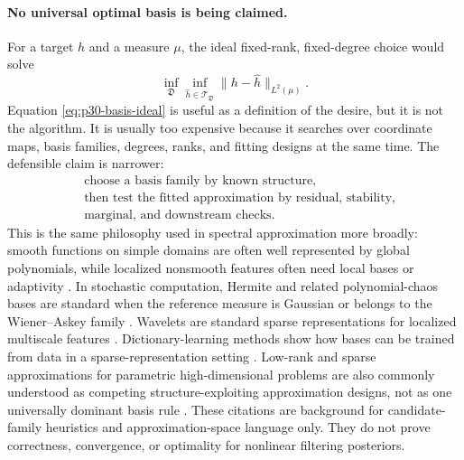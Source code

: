 \documentclass[11pt]{article}
\numberwithin{equation}{section}
\begin{document}
\paragraph{No universal optimal basis is being claimed.}
For a target \(h\) and a measure \(\mu\), the ideal fixed-rank, fixed-degree
choice would solve
\begin{equation}
    \inf_{\mathfrak D}
    \inf_{\widehat h\in\mathcal T_{\mathfrak D}}
    \|h-\widehat h\|_{L^2(\mu)}.
    \label{eq:p30-basis-ideal}
\end{equation}
Equation \eqref{eq:p30-basis-ideal} is useful as a definition of the desire,
but it is not the algorithm.  It is usually too expensive because it searches
over coordinate maps, basis families, degrees, ranks, and fitting designs at
the same time.  The defensible claim is narrower:
\begin{equation}
    \begin{aligned}
    &\text{choose a basis family by known structure,}\\
    &\text{then test the fitted approximation by residual, stability,}\\
    &\text{marginal, and downstream checks.}
    \end{aligned}
    \label{eq:p30-basis-claim}
\end{equation}
This is the same philosophy used in spectral approximation more broadly:
smooth functions on simple domains are often well represented by global
polynomials, while localized nonsmooth features often need local bases or
adaptivity \cite{trefethen2019approximation}.  In stochastic computation,
Hermite and related polynomial-chaos bases are standard when the reference
measure is Gaussian or belongs to the Wiener--Askey family
\cite{ghanem1991stochastic,xiu2002wieneraskey}.  Wavelets are standard sparse
representations for localized multiscale features \cite{daubechies1992ten,mallat2009wavelet}.
Dictionary-learning methods show how bases can be trained from data in a
sparse-representation setting \cite{aharon2006ksvd}.  Low-rank and sparse
approximations for parametric high-dimensional problems are also commonly
understood as competing structure-exploiting approximation designs, not as one
universally dominant basis rule \cite{bachmayr2018parametric}.
These citations are background for candidate-family heuristics and
approximation-space language only.  They do not prove correctness, convergence,
or optimality for nonlinear filtering posteriors.
\end{document}

